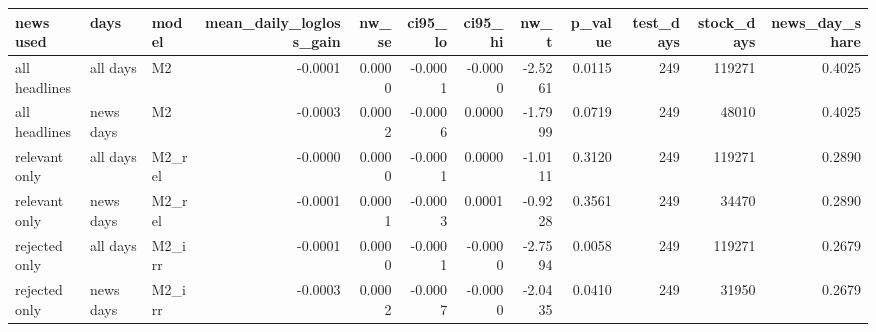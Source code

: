 \begin{tabular}{lllrrrrrrrrr}
\toprule
news used & days & model & mean\_daily\_logloss\_gain & nw\_se & ci95\_lo & ci95\_hi & nw\_t & p\_value & test\_days & stock\_days & news\_day\_share \\
\midrule
all headlines & all days & M2 & -0.0001 & 0.0000 & -0.0001 & -0.0000 & -2.5261 & 0.0115 & 249 & 119271 & 0.4025 \\
all headlines & news days & M2 & -0.0003 & 0.0002 & -0.0006 & 0.0000 & -1.7999 & 0.0719 & 249 & 48010 & 0.4025 \\
relevant only & all days & M2\_rel & -0.0000 & 0.0000 & -0.0001 & 0.0000 & -1.0111 & 0.3120 & 249 & 119271 & 0.2890 \\
relevant only & news days & M2\_rel & -0.0001 & 0.0001 & -0.0003 & 0.0001 & -0.9228 & 0.3561 & 249 & 34470 & 0.2890 \\
rejected only & all days & M2\_irr & -0.0001 & 0.0000 & -0.0001 & -0.0000 & -2.7594 & 0.0058 & 249 & 119271 & 0.2679 \\
rejected only & news days & M2\_irr & -0.0003 & 0.0002 & -0.0007 & -0.0000 & -2.0435 & 0.0410 & 249 & 31950 & 0.2679 \\
\bottomrule
\end{tabular}
